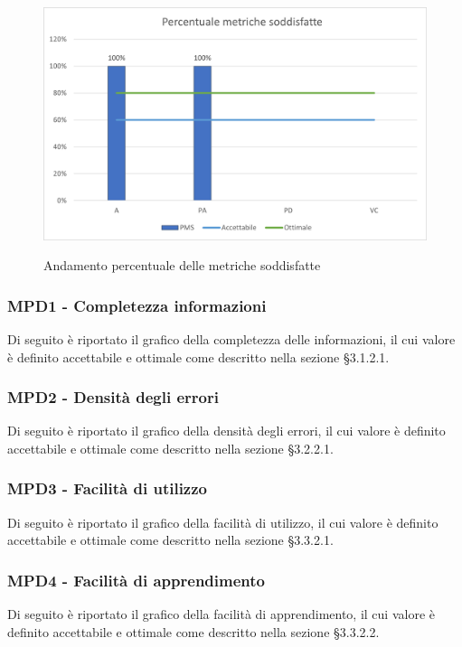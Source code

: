 \begin{figure}[H]
\centering
\includegraphics[scale=0.78]{res/ResocontoAttivitaDiVerifica/res/metriche/grafici/img/metricheSoddisfatte.png}\\
\caption{Andamento percentuale delle metriche soddisfatte}
\end{figure}


\subsubsection{MPD1 - Completezza informazioni}
Di seguito è riportato il grafico della completezza delle informazioni, il cui valore è definito accettabile e ottimale come descritto nella sezione §3.1.2.1.\\


\subsubsection{MPD2 - Densità degli errori}
Di seguito è riportato il grafico della densità degli errori, il cui valore è definito accettabile e ottimale come descritto nella sezione §3.2.2.1.\\

\subsubsection{MPD3 - Facilità di utilizzo}
Di seguito è riportato il grafico della facilità di utilizzo, il cui valore è definito accettabile e ottimale come descritto nella sezione §3.3.2.1.\\

\subsubsection{MPD4 - Facilità di apprendimento}
Di seguito è riportato il grafico della facilità di apprendimento, il cui valore è definito accettabile e ottimale come descritto nella sezione §3.3.2.2.\\

